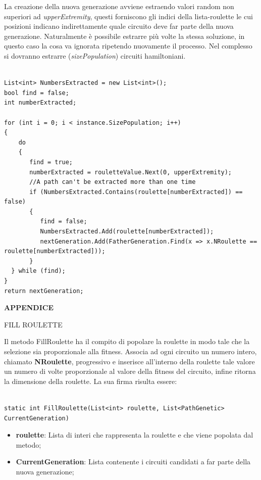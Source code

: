 \documentclass[11pt]{article}
\begin{document}
La creazione della nuova generazione avviene estraendo valori random non superiori ad \textit{upperExtremity}, questi forniscono gli indici della lista-roulette le cui posizioni indicano indirettamente quale circuito deve far parte della nuova generazione. Naturalmente è possibile estrarre più volte la stessa soluzione, in questo caso la cosa va ignorata ripetendo nuovamente il processo. Nel complesso si dovranno estrarre (\textit{sizePopulation}) circuiti hamiltoniani.

\begin{lstlisting}

List<int> NumbersExtracted = new List<int>();
bool find = false;
int numberExtracted;

for (int i = 0; i < instance.SizePopulation; i++)
{
    do
    {
       find = true;
       numberExtracted = rouletteValue.Next(0, upperExtremity);
       //A path can't be extracted more than one time
       if (NumbersExtracted.Contains(roulette[numberExtracted]) == false)
       {
          find = false;
          NumbersExtracted.Add(roulette[numberExtracted]);
          nextGeneration.Add(FatherGeneration.Find(x => x.NRoulette == roulette[numberExtracted]));
       }
  } while (find);
}
return nextGeneration;

\end{lstlisting}

\vspace{2\baselineskip}
\textbf{APPENDICE}
\vspace{2\baselineskip}

\vspace{2\baselineskip}
FILL ROULETTE
\vspace{2\baselineskip}

Il metodo FillRoulette ha il compito di popolare la roulette in modo tale che la selezione sia proporzionale alla fitness. Associa ad ogni circuito un numero intero, chiamato \textbf{NRoulette}, progressivo e inserisce all'interno della roulette tale valore un numero di volte proporzionale al valore della fitness del circuito, infine ritorna la dimensione della roulette. La sua firma risulta essere:

\begin{lstlisting}

static int FillRoulette(List<int> roulette, List<PathGenetic> CurrentGeneration)

\end{lstlisting}

\begin{itemize}
    \item \textbf{roulette}: Lista di interi che rappresenta la roulette e che viene popolata dal metodo;
    \item \textbf{CurrentGeneration}: Lista contenente i circuiti candidati a far parte della nuova generazione;
\end{itemize}
\end{document}
